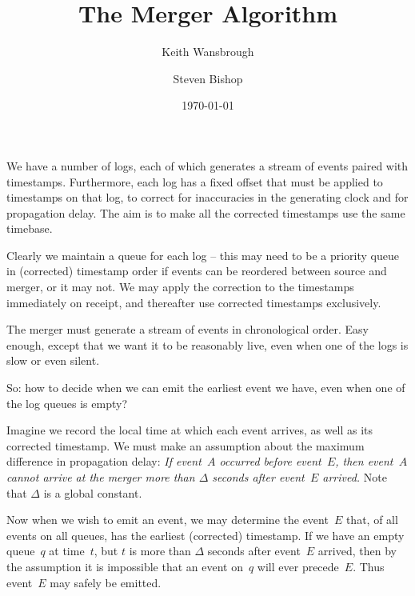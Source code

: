 \documentclass{article}
\begin{document}
\title{The Merger Algorithm}
\author{Keith Wansbrough\and Steven Bishop}
\date{\today}
\maketitle

We have a number of logs, each of which generates a stream of events
paired with timestamps.  Furthermore, each log has a fixed offset that
must be applied to timestamps on that log, to correct for inaccuracies
in the generating clock and for propagation delay.  The aim is to make
all the corrected timestamps use the same timebase.

Clearly we maintain a queue for each log -- this may need to be a
priority queue in (corrected) timestamp order if events can be
reordered between source and merger, or it may not.  We may apply the
correction to the timestamps immediately on receipt, and thereafter
use corrected timestamps exclusively.

The merger must generate a stream of events in chronological order.
Easy enough, except that we want it to be reasonably live, even when
one of the logs is slow or even silent.

So: how to decide when we can emit the earliest event we have, even
when one of the log queues is empty?

Imagine we record the local time at which each event arrives, as well
as its corrected timestamp.  We must make an assumption about the maximum difference in propagation
delay: \emph{If event~$A$ occurred before event~$E$, then event~$A$
cannot arrive at the merger more than $\Delta$ seconds after
event~$E$ arrived.}  Note that $\Delta$ is a global constant.

Now when we wish to emit an event, we may determine the event~$E$
that, of all events on all queues, has the earliest (corrected)
timestamp.  If we have an empty queue~$q$ at time~$t$, but $t$ is more
than $\Delta$ seconds after event~$E$ arrived, then by the assumption
it is impossible that an event on~$q$ will ever precede~$E$.  Thus
event~$E$ may safely be emitted.
\end{document}
